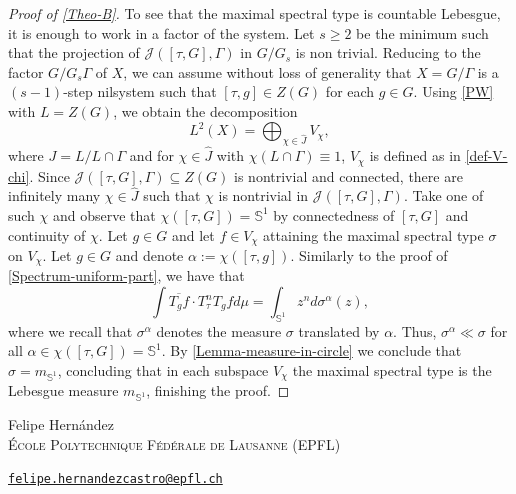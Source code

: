 \documentclass[letter, 11pt]{article}
\theoremstyle{definition}
\theoremstyle{plain}
\newcommand{\bS}{\mathbb{S}}
\newcommand{\1}{\mathbbm{1}}
\begin{document}
\begin{proof}[Proof of \cref{Theo-B}]
To see that the maximal spectral type is countable Lebesgue, it is enough to work in a factor of the system. Let $s\geq 2$ be the minimum such that the projection of $\mathcal{J}([\tau,G],\Gamma)$ in $G/G_{s}$ is non trivial. Reducing to the factor $G/G_s\Gamma$ of $X$, we can assume without loss of generality that $X=G/\Gamma$ is a $(s-1)$-step nilsystem such that $[\tau,g]\in Z(G)$ for each $g\in G$. Using \cref{PW} with $L=Z(G)$, we obtain the decomposition 
$$L^2(X)=\bigoplus_{\chi\in \widehat{J}}V_\chi, $$
    where $J= L/L\cap \Gamma$ and for $\chi\in \widehat{J}$ with $\chi(L\cap \Gamma)\equiv 1$, $V_\chi$ is defined as in \cref{def-V-chi}. 
    Since $\mathcal{J}([\tau,G],\Gamma)\subseteq Z(G)$ is nontrivial and connected, there are infinitely many $\chi\in \hat{J}$ such that $\chi$ is nontrivial in $\mathcal{J}([\tau,G],\Gamma)$. Take one of such $\chi$ and observe that $\chi([\tau,G])=\bS^1$ by connectedness of $[\tau,G]$ and continuity of $\chi$. Let $g\in G$ and let $f\in V_\chi$ attaining the maximal spectral type $\sigma$ on $V_\chi$. Let $g\in G$ and denote $\alpha:=  \chi([\tau,g])$. Similarly to the proof of \cref{Spectrum-uniform-part}, we have that 
    \begin{equation*}
       \int  \overline{T_gf} \cdot T_\tau^nT_gfd\mu= \int_{\bS^1} z^n d\sigma^\alpha(z),
    \end{equation*}
where we recall that $\sigma^\alpha$ denotes the measure $\sigma$ translated by $\alpha$. Thus, $\sigma^\alpha\ll \sigma$ for all $\alpha\in \chi([\tau,G])=\bS^1    $. By \cref{Lemma-measure-in-circle} we conclude that $\sigma=m_{\bS^1}$, concluding that in each subspace $V_\chi$ the maximal spectral type is the Lebesgue measure $m_{\bS^1}$, finishing the proof.  
\end{proof}
  

\small{


}

\bigskip
\noindent
Felipe Hernández\\
\textsc{{\'E}cole Polytechnique F{\'e}d{\'e}rale de Lausanne} (EPFL)\par\nopagebreak
\noindent
\href{mailto:felipe.hernandezcastro@epfl.ch}
{\texttt{felipe.hernandezcastro@epfl.ch}}
\end{document}
